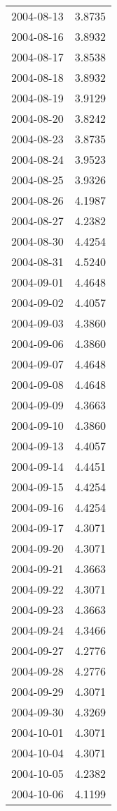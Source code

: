 \begin{tabular}{lr}
2004-08-13 &      3.8735 \\
2004-08-16 &      3.8932 \\
2004-08-17 &      3.8538 \\
2004-08-18 &      3.8932 \\
2004-08-19 &      3.9129 \\
2004-08-20 &      3.8242 \\
2004-08-23 &      3.8735 \\
2004-08-24 &      3.9523 \\
2004-08-25 &      3.9326 \\
2004-08-26 &      4.1987 \\
2004-08-27 &      4.2382 \\
2004-08-30 &      4.4254 \\
2004-08-31 &      4.5240 \\
2004-09-01 &      4.4648 \\
2004-09-02 &      4.4057 \\
2004-09-03 &      4.3860 \\
2004-09-06 &      4.3860 \\
2004-09-07 &      4.4648 \\
2004-09-08 &      4.4648 \\
2004-09-09 &      4.3663 \\
2004-09-10 &      4.3860 \\
2004-09-13 &      4.4057 \\
2004-09-14 &      4.4451 \\
2004-09-15 &      4.4254 \\
2004-09-16 &      4.4254 \\
2004-09-17 &      4.3071 \\
2004-09-20 &      4.3071 \\
2004-09-21 &      4.3663 \\
2004-09-22 &      4.3071 \\
2004-09-23 &      4.3663 \\
2004-09-24 &      4.3466 \\
2004-09-27 &      4.2776 \\
2004-09-28 &      4.2776 \\
2004-09-29 &      4.3071 \\
2004-09-30 &      4.3269 \\
2004-10-01 &      4.3071 \\
2004-10-04 &      4.3071 \\
2004-10-05 &      4.2382 \\
2004-10-06 &      4.1199 \\

\end{tabular}

